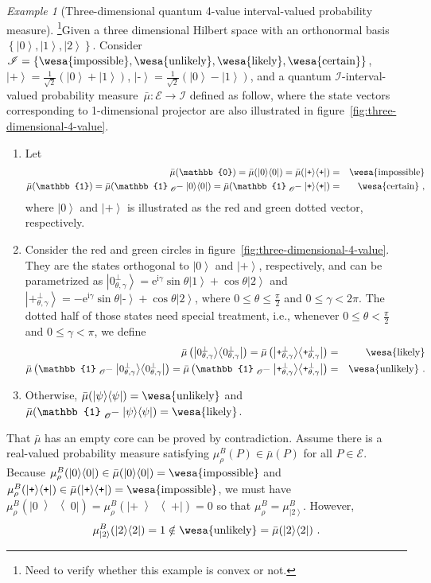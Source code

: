 \documentclass{article}
\theoremstyle{remark}
\newtheorem{example}{Example}
\newcommand{\events}{\ensuremath{\mathcal{E}}}
\newcommand{\imposs}{{\mbox{\wesa{impossible}}}}
\newcommand{\likely}{{\mbox{\wesa{likely}}}}
\newcommand{\unlikely}{{\mbox{\wesa{unlikely}}}}
\newcommand{\necess}{{\mbox{\wesa{certain}}}}
\newcommand{\ket}[1]{{\left\vert{#1}\right\rangle}}
\newcommand{\op}[2]{\ensuremath{\left\vert{#1}\middle\rangle\middle\langle{#2}\right\vert}}
\newcommand{\proj}[1]{\op{#1}{#1}}
\newcommand{\ps}{\texttt{+}}
\newcommand{\ms}{\texttt{-}}
\newcommand{\rme}{\mathrm{e}}
\newcommand{\rmi}{\mathrm{i}}
\begin{document}
\begin{example}[Three-dimensional quantum 4-value interval-valued
probability measure]\label{ex:three-dimensional-4-value} \footnote{Need to verify whether this example is convex or not.}Given
a three dimensional Hilbert space with an orthonormal basis $\left\{ \ket{0},\ket{1},\ket{2}\right\} $.
Consider\emph{ }$\mathscr{I}=\left\{ \imposs,\unlikely,\likely,\necess\right\} $,
$\ket{\ps}=\frac{1}{\sqrt{2}}(\ket{0}+\ket{1})$, $\ket{\ms}=\frac{1}{\sqrt{2}}(\ket{0}-\ket{1})$,
and a quantum $\mathscr{I}$-interval-valued probability measure~$\bar{\mu}:\events\rightarrow\mathscr{I}$
defined as follow, where the state vectors corresponding to 1-dimensional
projector are also illustrated in figure~\ref{fig:three-dimensional-4-value}.
\begin{enumerate}
\item Let 
\begin{eqnarray*}
\bar{\mu}(\mathbb{0})=\bar{\mu}(\proj{0})=\bar{\mu}(\proj{\ps}) & = & \imposs\\
\bar{\mu}(\mathbb{1})=\bar{\mu}(\mathbb{1}\tensor*[_{\mathscr{O}}]{-}{}\proj{0})=\bar{\mu}(\mathbb{1}\tensor*[_{\mathscr{O}}]{-}{}\proj{\ps}) & = & \necess\textrm{ ,}
\end{eqnarray*}
 where $\ket{0}$ and $\ket{\ps}$ is illustrated as the red and green
dotted vector, respectively.
\item Consider the red and green circles in figure~\ref{fig:three-dimensional-4-value}.
They are the states orthogonal to $\ket{0}$ and $\ket{\ps}$, respectively,
and can be parametrized as $\ket{0_{\theta,\gamma}^{\perp}}=\rme^{\rmi\gamma}\sin\theta\ket{1}+\cos\theta\ket{2}$
and $\ket{\ps_{\theta,\gamma}^{\perp}}=-\rme^{\rmi\gamma}\sin\theta\ket{\ms}+\cos\theta\ket{2}$,
where $0\le\theta\le\frac{\pi}{2}$ and $0\le\gamma<2\pi$. The dotted
half of those states need special treatment, i.e., whenever $0\le\theta<\frac{\pi}{2}$
and $0\le\gamma<\pi$, we define 
\begin{eqnarray*}
\bar{\mu}\left(\proj{0_{\theta,\gamma}^{\perp}}\right)=\bar{\mu}\left(\proj{\ps_{\theta,\gamma}^{\perp}}\right) & = & \likely\\
\bar{\mu}\left(\mathbb{1}\tensor*[_{\mathscr{O}}]{-}{}\proj{0_{\theta,\gamma}^{\perp}}\right)=\bar{\mu}\left(\mathbb{1}\tensor*[_{\mathscr{O}}]{-}{}\proj{\ps_{\theta,\gamma}^{\perp}}\right) & = & \unlikely\textrm{ .}
\end{eqnarray*}
\item Otherwise, $\bar{\mu}(\proj{\psi})=\unlikely$ and $\bar{\mu}(\mathbb{1}\tensor*[_{\mathscr{O}}]{-}{}\proj{\psi})=\likely$. 
\end{enumerate}
That $\bar{\mu}$ has an empty core can be proved by contradiction.
Assume there is a real-valued probability measure satisfying $\mu_{\rho}^{B}(P)\in\bar{\mu}(P)$
for all $P\in\events$. Because $\mu_{\rho}^{B}(\proj{0})\in\bar{\mu}(\proj{0})=\imposs$
and $\mu_{\rho}^{B}(\proj{\ps})\in\bar{\mu}(\proj{\ps})=\imposs$,
we must have $\mu_{\rho}^{B}(\proj{0})=\mu_{\rho}^{B}(\proj{\ps})=0$
so that $\mu_{\rho}^{B}=\mu_{\ket{2}}^{B}$. However, 
\[
\mu_{\ket{2}}^{B}(\proj{2})=1\notin\unlikely=\bar{\mu}(\proj{2})\textrm{ .}
\]


\end{example}
\end{document}
